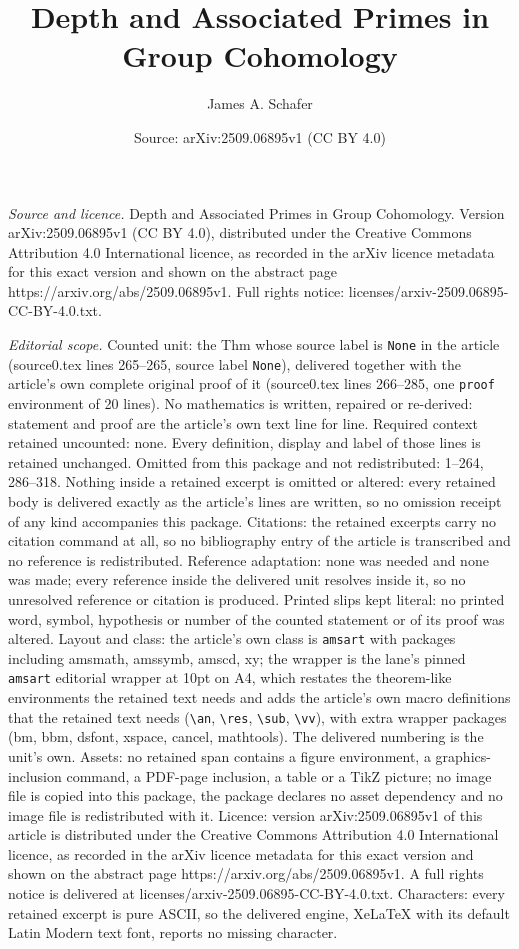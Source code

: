 \documentclass[10pt,a4paper]{amsart}
\title[Depth and Associated Primes in Group Cohomology]{Depth and Associated Primes in Group Cohomology}
\author{James A. Schafer}
\date{Source: arXiv:2509.06895v1 (CC BY 4.0)}
\begin{document}
\maketitle

\noindent\emph{Source and licence.} Depth and Associated Primes in Group Cohomology. Version arXiv:2509.06895v1 (CC BY 4.0), distributed under the Creative Commons Attribution 4.0 International licence, as recorded in the arXiv licence metadata for this exact version and shown on the abstract page https://arxiv.org/abs/2509.06895v1. Full rights notice: licenses/arxiv-2509.06895-CC-BY-4.0.txt.\par\smallskip

\noindent\textit{Editorial scope.} Counted unit: the Thm whose source label is \texttt{None} in the article (source0.tex lines 265--265, source label \texttt{None}), delivered together with the article's own complete original proof of it (source0.tex lines 266--285, one \texttt{proof} environment of 20 lines). No mathematics is written, repaired or re-derived: statement and proof are the article's own text line for line. Required context retained uncounted: none. Every definition, display and label of those lines is retained unchanged. Omitted from this package and not redistributed: 1--264, 286--318. Nothing inside a retained excerpt is omitted or altered: every retained body is delivered exactly as the article's lines are written, so no omission receipt of any kind accompanies this package. Citations: the retained excerpts carry no citation command at all, so no bibliography entry of the article is transcribed and no reference is redistributed. Reference adaptation: none was needed and none was made; every reference inside the delivered unit resolves inside it, so no unresolved reference or citation is produced. Printed slips kept literal: no printed word, symbol, hypothesis or number of the counted statement or of its proof was altered. Layout and class: the article's own class is \texttt{amsart} with packages including amsmath, amssymb, amscd, xy; the wrapper is the lane's pinned \texttt{amsart} editorial wrapper at 10pt on A4, which restates the theorem-like environments the retained text needs and adds the article's own macro definitions that the retained text needs (\texttt{\textbackslash an}, \texttt{\textbackslash res}, \texttt{\textbackslash sub}, \texttt{\textbackslash vv}), with extra wrapper packages (bm, bbm, dsfont, xspace, cancel, mathtools). The delivered numbering is the unit's own. Assets: no retained span contains a figure environment, a graphics-inclusion command, a PDF-page inclusion, a table or a TikZ picture; no image file is copied into this package, the package declares no asset dependency and no image file is redistributed with it. Licence: version arXiv:2509.06895v1 of this article is distributed under the Creative Commons Attribution 4.0 International licence, as recorded in the arXiv licence metadata for this exact version and shown on the abstract page https://arxiv.org/abs/2509.06895v1. A full rights notice is delivered at licenses/arxiv-2509.06895-CC-BY-4.0.txt. Characters: every retained excerpt is pure ASCII, so the delivered engine, XeLaTeX with its default Latin Modern text font, reports no missing character.
\end{document}

